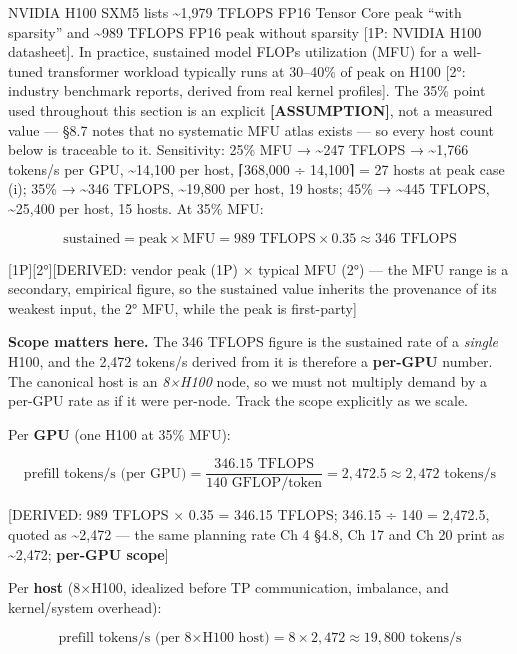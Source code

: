 NVIDIA H100 SXM5 lists \textasciitilde1,979 TFLOPS FP16 Tensor Core peak
``with sparsity'' and \textasciitilde989 TFLOPS FP16 peak without
sparsity {[}1P: NVIDIA H100 datasheet{]}. In practice, sustained model
FLOPs utilization (MFU) for a well-tuned transformer workload typically
runs at 30--40\% of peak on H100 {[}2°: industry benchmark reports,
derived from real kernel profiles{]}. The 35\% point used throughout
this section is an explicit \textbf{\mbox{{[}ASSUMPTION{]}}}, not a measured
value --- §8.7 notes that no systematic MFU atlas exists --- so every
host count below is traceable to it. Sensitivity: 25\% MFU →
\textasciitilde247 TFLOPS → \textasciitilde1,766 tokens/s per GPU,
\textasciitilde14,100 per host, ⌈368,000 ÷ 14,100⌉ = 27 hosts at peak
case (i); 35\% → \textasciitilde346 TFLOPS, \textasciitilde19,800 per
host, 19 hosts; 45\% → \textasciitilde445 TFLOPS, \textasciitilde25,400
per host, 15 hosts. At 35\% MFU:

\[
\text{sustained} = \text{peak} \times \text{MFU} = 989 \text{ TFLOPS} \times 0.35 \approx 346 \text{ TFLOPS}
\]

\mbox{{[}1P{]}}\hspace{0pt}\mbox{{[}2°{]}}{[}DERIVED: vendor peak (1P) × typical MFU (2°) --- the
MFU range is a secondary, empirical figure, so the sustained value
inherits the provenance of its weakest input, the 2° MFU, while the peak
is first-party{]}

\textbf{Scope matters here.} The 346 TFLOPS figure is the sustained rate
of a \emph{single} H100, and the 2,472 tokens/s derived from it is
therefore a \textbf{per-GPU} number. The canonical host is an
\emph{8×H100} node, so we must not multiply demand by a per-GPU rate as
if it were per-node. Track the scope explicitly as we scale.

Per \textbf{GPU} (one H100 at 35\% MFU):

\[
\text{prefill tokens/s (per GPU)} = \frac{346.15 \text{ TFLOPS}}{140 \text{ GFLOP/token}} = 2{,}472.5 \approx 2{,}472 \text{ tokens/s}
\]

{[}DERIVED: 989 TFLOPS × 0.35 = 346.15 TFLOPS; 346.15 ÷ 140 = 2,472.5,
quoted as \textasciitilde2,472 --- the same planning rate Ch 4 §4.8, Ch
17 and Ch 20 print as \textasciitilde2,472; \textbf{per-GPU scope}{]}

Per \textbf{host} (8×H100, idealized before TP communication, imbalance,
and kernel/system overhead):

\[
\text{prefill tokens/s (per 8×H100 host)} = 8 \times 2{,}472 \approx 19{,}800 \text{ tokens/s}
\]

